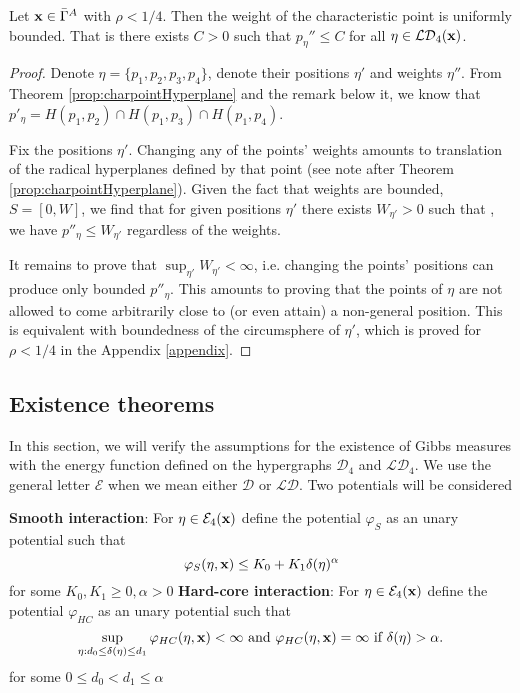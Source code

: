 \begin{proposition}\label{prop:maxPeta}
	Let ${\mathbf{x}} \in \bar\Gamma^A$ with $\rho < 1/4$. Then the weight of the characteristic point is uniformly bounded. That is there exists $C>0$ such that $p_\eta'' \leq C$ for all $\eta \in \mathcal {LD}_4({\mathbf{x}})$. 
\end{proposition}
\begin{proof}
Denote $\eta=\{p_1,p_2,p_3,p_4\}$, denote their positions $\eta'$ and weights $\eta''$. From Theorem \ref{prop:charpointHyperplane} and the remark below it, we know that $p'_\eta = H(p_1,p_2)\cap H(p_1,p_3) \cap H(p_1,p_4)$.

Fix the positions $\eta'$.  Changing any of the points' weights amounts to translation of the radical hyperplanes defined by that point (see note after Theorem \ref{prop:charpointHyperplane}). Given the fact that weights are bounded, $S=[0,W]$, we find that for given positions $\eta'$ there exists $W_{\eta'}>0$ such that , we have $p''_\eta \leq W_{\eta'}$ regardless of the weights.

It remains to prove that $\sup_{\eta'} W_{\eta'} < \infty$, i.e. changing the points' positions can produce only bounded $p''_\eta$. This amounts to proving that the points of $\eta$ are not allowed to come arbitrarily close to (or even attain) a non-general position. This is equivalent with boundedness of the circumsphere of $\eta'$, which is proved for $\rho<1/4$ in the Appendix \ref{appendix}.
\end{proof}




\subsection{Existence theorems}\label{sec:Existence}
In this section, we will verify the assumptions for the existence of Gibbs measures with the energy function defined on the hypergraphs $\mathcal D_4$ and $\mathcal {LD}_4$. We use the general letter $\mathcal E$ when we mean either $\mathcal D$ or $\mathcal {LD}$. Two potentials will be considered

\textbf{Smooth interaction}:  For $\eta\in\mathcal E_4({\mathbf{x}})$ define the potential $\varphi_S$ as an unary potential such that
$$\varphi_S(\eta,{\mathbf{x}}) \leq K_0 + K_1 \delta(\eta)^{\alpha}$$
for some $K_0,K_1 \geq 0, \alpha >0$\newline
\textbf{Hard-core interaction}: For $\eta\in\mathcal E_4({\mathbf{x}})$ define the potential $\varphi_{HC}$ as an unary potential such that
$$\sup_{\eta: d_0 \leq \delta(\eta) \leq d_1} \varphi_{HC}(\eta,{\mathbf{x}})  < \infty \text{ and } \varphi_{HC}(\eta,{\mathbf{x}})=\infty \text{ if } \delta(\eta)>\alpha.$$ 
for some $0\leq d_0 < d_1 \leq \alpha$ 

